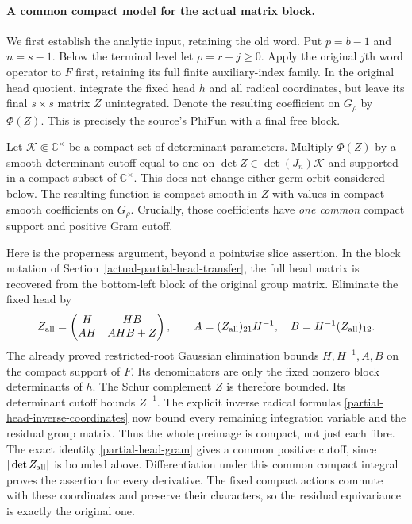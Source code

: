 \paragraph{A common compact model for the actual matrix block.}
We first establish the analytic input, retaining the old word.
Put $p=b-1$ and $n=s-1$.  Below the terminal level let
$\rho=r-j\ge0$.  Apply the original $j$th word operator to $F$
first, retaining its full finite auxiliary-index family.  In the
original head quotient, integrate the fixed head $h$ and all
radical coordinates, but leave its final $s\times s$ matrix $Z$
unintegrated.  Denote the resulting coefficient on $G_\rho$ by
$\Phi(Z)$.  This is precisely the source's $\mathrm{PhiFun}$
with a final free block.

Let $\mathcal K\Subset\mathbb C^\times$ be a compact set of
determinant parameters.  Multiply $\Phi(Z)$ by a smooth determinant
cutoff equal to one on $\det Z\in\det(J_n)\mathcal K$ and
supported in a compact subset of $\mathbb C^\times$.  This does
not change either germ orbit considered below.  The resulting
function is compact smooth in $Z$ with values in compact smooth
coefficients on $G_\rho$.  Crucially, those coefficients have
\emph{one common} compact support and positive Gram cutoff.

Here is the properness argument, beyond a pointwise slice assertion.
In the block notation of Section~\ref{actual-partial-head-transfer},
the full head matrix is recovered from the bottom-left block of
the original group matrix.  Eliminate the fixed head by
\[
 Z_{\rm all}=\begin{pmatrix}H&HB\\ AH&AHB+Z\end{pmatrix},
 \qquad A=(Z_{\rm all})_{21}H^{-1},\quad
 B=H^{-1}(Z_{\rm all})_{12}.
\]
The already proved restricted-root Gaussian elimination bounds
$H,H^{-1},A,B$ on the compact support of $F$.  Its denominators
are only the fixed nonzero block determinants of $h$.
The Schur complement $Z$ is therefore bounded.  Its determinant
cutoff bounds $Z^{-1}$.  The explicit inverse radical formulas
\eqref{partial-head-inverse-coordinates} now bound every remaining
integration variable and the residual group matrix.  Thus the
whole preimage is compact, not just each fibre.  The exact identity
\eqref{partial-head-gram} gives a common positive cutoff, since
$|\det Z_{\rm all}|$ is bounded above.  Differentiation under this
common compact integral proves the assertion for every derivative.
The fixed compact actions commute with these coordinates and
preserve their characters, so the residual equivariance is exactly
the original one.

